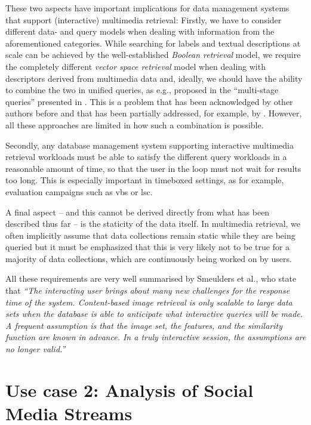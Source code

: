 These two aspects have important implications for data management systems that support (interactive) multimedia retrieval: Firstly, we have to consider different data- and query models when dealing with information from the aforementioned categories. While searching for labels and textual descriptions at scale can be achieved by the well-established \emph{Boolean retrieval} model, we require the completely different \emph{vector space retrieval} model when dealing with descriptors derived from multimedia data and, ideally, we should have the ability to combine the two in unified queries, as e.g., proposed in the ``multi-stage queries'' presented in \cite{Heller:2020Multi}. This is a problem that has been acknowledged by other authors before \cite{Jonson:2016} and that has been partially addressed, for example, by \cite{Giangreco:2018thesis,Giangreco:2016adam,Wang2021:Milvus}. However, all these approaches are limited in how such a combination is possible.

Secondly, any database management system supporting interactive multimedia retrieval workloads must be able to satisfy the different query workloads in a reasonable amount of time, so that the user in the loop must not wait for results too long. This is especially important in timeboxed settings, as for example, evaluation campaigns such as \acrshort{vbs} or \acrshort{lsc}.

A final aspect -- and this cannot be derived directly from what has been described thus far -- is the staticity of the data itself. In multimedia retrieval, we often implicitly assume that data collections remain static while they are being queried but it must be emphasized that this is very likely not to be true for a majority of data collections, which are continuously being worked on by users. 

All these requirements are very well summarised by Smeulders et al., who state that \emph{``The interacting user brings about many new challenges for the response time of the system. Content-based image retrieval is only scalable to large data sets when the database is able to anticipate what interactive queries will be made. A frequent assumption is that the image set, the features, and the similarity function are known in advance. In a truly interactive session, the assumptions are no longer valid.''} \cite{Smeulders:2000Content}

\section{Use case 2: Analysis of Social Media Streams}
\label{section:application_online_analysis}

